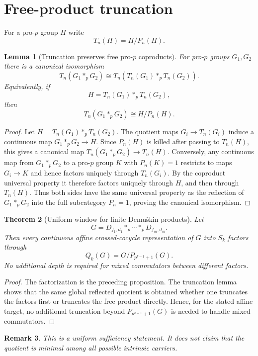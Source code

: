 \documentclass[11pt]{article}
\newtheorem{theorem}{Theorem}[section]
\newtheorem{lemma}[theorem]{Lemma}
\newtheorem{remark}[theorem]{Remark}
\begin{document}
\section{Free-product truncation}

For a pro-$p$ group $H$ write
\[
T_n(H)=H/P_n(H).
\]

\begin{lemma}[Truncation preserves free pro-$p$ coproducts]
For pro-$p$ groups $G_1,G_2$ there is a canonical isomorphism
\[
T_n(G_1*_pG_2)
\cong
T_n\!\left(T_n(G_1)*_pT_n(G_2)\right).
\]
Equivalently, if
\[
H=T_n(G_1)*_pT_n(G_2),
\]
then
\[
T_n(G_1*_pG_2)\cong H/P_n(H).
\]
\end{lemma}

\begin{proof}
Let $H=T_n(G_1)*_pT_n(G_2)$. The quotient maps $G_i\to T_n(G_i)$ induce a continuous map
$G_1*_pG_2\to H$. Since $P_n(H)$ is killed after passing to $T_n(H)$, this gives a canonical map
$T_n(G_1*_pG_2)\to T_n(H)$. Conversely, any continuous map from $G_1*_pG_2$ to a pro-$p$ group $K$ with $P_n(K)=1$ restricts to maps $G_i\to K$ and hence factors uniquely through $T_n(G_i)$. By the coproduct universal property it therefore factors uniquely through $H$, and then through $T_n(H)$. Thus both sides have the same universal property as the reflection of $G_1*_pG_2$ into the full subcategory $P_n=1$, proving the canonical isomorphism.
\end{proof}

\begin{theorem}[Uniform window for finite Demuškin products]
Let
\[
G=D_{f_1,d_1}*_p\cdots *_pD_{f_m,d_m}.
\]
Then every continuous affine crossed-cocycle representation of $G$ into $S_k$ factors through
\[
Q_k(G)=G/P_{p^{k-1}+1}(G).
\]
No additional depth is required for mixed commutators between different factors.
\end{theorem}

\begin{proof}
The factorization is the preceding proposition. The truncation lemma shows that the same global reflected quotient is obtained whether one truncates the factors first or truncates the free product directly. Hence, for the stated affine target, no additional truncation beyond $P_{p^{k-1}+1}(G)$ is needed to handle mixed commutators.
\end{proof}

\begin{remark}
This is a uniform sufficiency statement. It does not claim that the quotient is minimal among all possible intrinsic carriers.
\end{remark}
\end{document}
